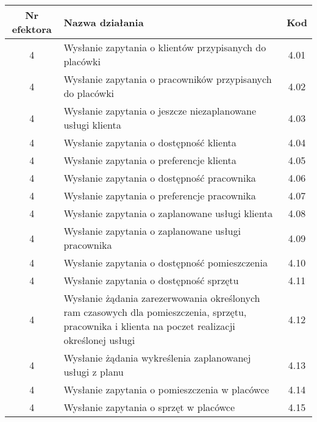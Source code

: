\begin{tabular}{c|p{5cm}|c}
Nr efektora & Nazwa działania & Kod\\
\hline
4 & Wysłanie zapytania o klientów przypisanych do placówki & 4.01\\
4 & Wysłanie zapytania o pracowników przypisanych do placówki & 4.02\\
4 & Wysłanie zapytania o jeszcze niezaplanowane usługi klienta & 4.03\\
4 & Wysłanie zapytania o dostępność klienta & 4.04\\
4 & Wysłanie zapytania o preferencje klienta & 4.05\\
4 & Wysłanie zapytania o dostępność pracownika & 4.06\\
4 & Wysłanie zapytania o preferencje pracownika & 4.07\\
4 & Wysłanie zapytania o zaplanowane usługi klienta & 4.08\\
4 & Wysłanie zapytania o zaplanowane usługi pracownika & 4.09\\
4 & Wysłanie zapytania o dostępność pomieszczenia & 4.10\\
4 & Wysłanie zapytania o dostępność sprzętu & 4.11\\
4 & Wysłanie żądania zarezerwowania określonych ram czasowych dla pomieszczenia, sprzętu, pracownika i klienta na poczet realizacji określonej usługi & 4.12\\
4 & Wysłanie żądania wykreślenia zaplanowanej usługi z planu & 4.13\\
4 & Wysłanie zapytania o pomieszczenia w placówce & 4.14\\
4 & Wysłanie zapytania o sprzęt w placówce & 4.15\\
\end{tabular}



